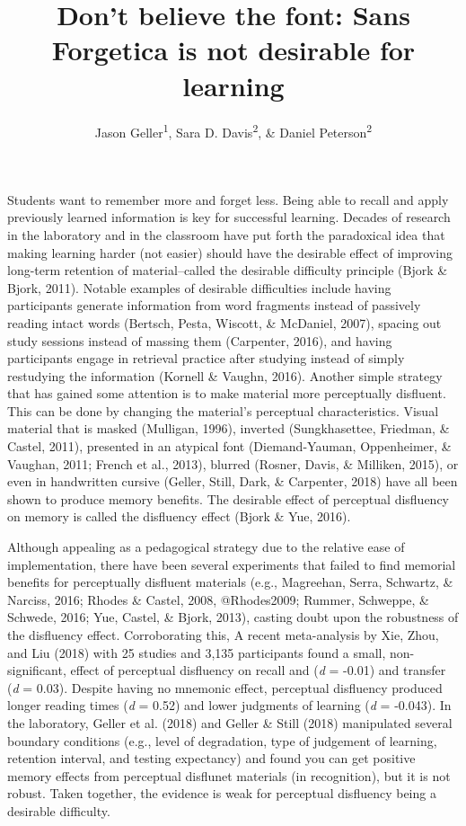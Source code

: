 \documentclass[english,pdf]{apa6}
\author{Jason Geller\textsuperscript{1}, Sara D. Davis\textsuperscript{2}, \& Daniel Peterson\textsuperscript{2}}
\affiliation{
\vspace{0.5cm}
\textsuperscript{1} University of Iowa\\\textsuperscript{2} Skidmore College}
\title{Don't believe the font: Sans Forgetica is not desirable for learning}
\date{}
\begin{document}
\maketitle

Students want to remember more and forget less. Being able to recall and apply previously learned information is key for successful learning. Decades of research in the laboratory and in the classroom have put forth the paradoxical idea that making learning harder (not easier) should have the desirable effect of improving long-term retention of material--called the desirable difficulty principle (Bjork \& Bjork, 2011). Notable examples of desirable difficulties include having participants generate information from word fragments instead of passively reading intact words (Bertsch, Pesta, Wiscott, \& McDaniel, 2007), spacing out study sessions instead of massing them (Carpenter, 2016), and having participants engage in retrieval practice after studying instead of simply restudying the information (Kornell \& Vaughn, 2016). Another simple strategy that has gained some attention is to make material more perceptually disfluent. This can be done by changing the material's perceptual characteristics. Visual material that is masked (Mulligan, 1996), inverted (Sungkhasettee, Friedman, \& Castel, 2011), presented in an atypical font (Diemand-Yauman, Oppenheimer, \& Vaughan, 2011; French et al., 2013), blurred (Rosner, Davis, \& Milliken, 2015), or even in handwritten cursive (Geller, Still, Dark, \& Carpenter, 2018) have all been shown to produce memory benefits. The desirable effect of perceptual disfluency on memory is called the disfluency effect (Bjork \& Yue, 2016).

Although appealing as a pedagogical strategy due to the relative ease of implementation, there have been several experiments that failed to find memorial benefits for perceptually disfluent materials (e.g., Magreehan, Serra, Schwartz, \& Narciss, 2016; Rhodes \& Castel, 2008, @Rhodes2009; Rummer, Schweppe, \& Schwede, 2016; Yue, Castel, \& Bjork, 2013), casting doubt upon the robustness of the disfluency effect. Corroborating this, A recent meta-analysis by Xie, Zhou, and Liu (2018) with 25 studies and 3,135 participants found a small, non-significant, effect of perceptual disfluency on recall and (\emph{d} = -0.01) and transfer (\emph{d} = 0.03). Despite having no mnemonic effect, perceptual disfluency produced longer reading times (\emph{d} = 0.52) and lower judgments of learning (\emph{d} = -0.043). In the laboratory, Geller et al. (2018) and Geller \& Still (2018) manipulated several boundary conditions (e.g., level of degradation, type of judgement of learning, retention interval, and testing expectancy) and found you can get positive memory effects from perceptual disflunet materials (in recognition), but it is not robust. Taken together, the evidence is weak for perceptual disfluency being a desirable difficulty.
\end{document}
